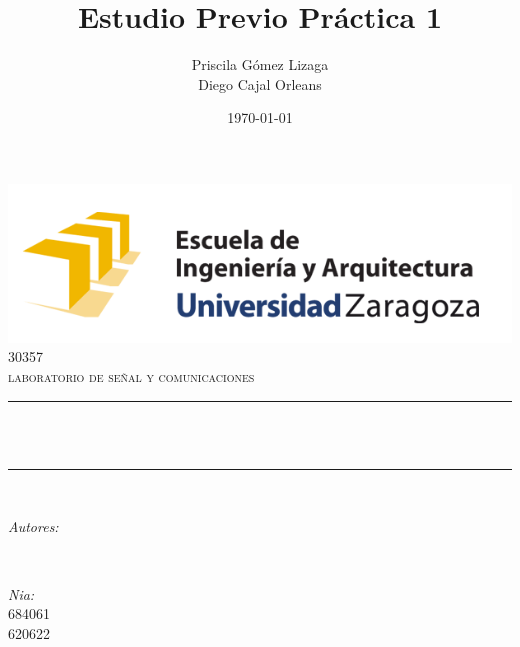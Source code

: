 \documentclass[12pt]{article}
\title{Estudio Previo Práctica 1}
\author{Priscila Gómez Lizaga \\ Diego Cajal Orleans}
\date{\today}
\makeatletter
\let\thetitle\@title
\let\theauthor\@author
\let\thedate\@date
\makeatother
\begin{document}

\begin{titlepage}
	\centering
    \vspace*{0.5 cm}
    \includegraphics[scale = 0.75]{eina.png}\\[1.0 cm]	%
	\textsc{\Large 30357}\\[0.5 cm]				%
	\textsc{\large laboratorio de señal y comunicaciones}\\[0.5 cm]				%
	\rule{\linewidth}{0.2 mm} \\[0.4 cm]
	\setlength{\baselineskip}{2\baselineskip}
	{ \huge \bfseries \thetitle}\\
	\rule{\linewidth}{0.2 mm} \\[1.5 cm]
	
	\begin{minipage}{0.4\textwidth}
		\begin{flushleft} \large
			\emph{Autores:}\\
			\theauthor
			\end{flushleft}
			\end{minipage}~
			\begin{minipage}{0.4\textwidth}
			\begin{flushright} \large
			\emph{Nia:} \\
			684061 \\
			620622
		\end{flushright}
	\end{minipage}\\[2 cm]
	
	{\large \thedate}\\[2 cm]
 
	\vfill
	
\end{titlepage}

\end{document}
